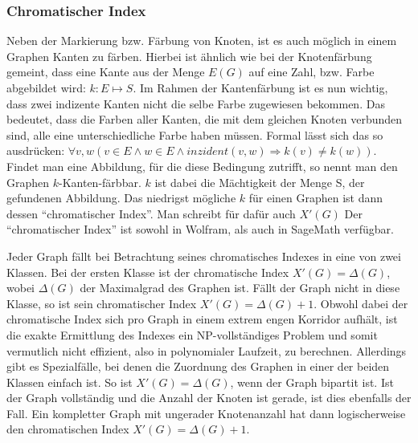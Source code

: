 \documentclass[a4paper,12pt,ngerman,chapterprefix=false,listof=totoc,bibliography=totoc]{scrreprt}
\begin{document}
\subsubsection*{Chromatischer Index}
{
Neben der Markierung bzw. Färbung von Knoten, ist es auch möglich in einem Graphen Kanten zu färben. Hierbei ist ähnlich wie bei der Knotenfärbung gemeint, dass eine Kante aus der Menge \(E(G)\) auf eine Zahl, bzw. Farbe abgebildet wird: \(k: E\mapsto S\). Im Rahmen der Kantenfärbung ist es nun wichtig, dass zwei indizente Kanten nicht die selbe Farbe zugewiesen bekommen. Das bedeutet, dass die Farben aller Kanten, die mit dem gleichen Knoten verbunden sind, alle eine unterschiedliche Farbe haben müssen. Formal lässt sich das so ausdrücken: \(\forall v,w(v\in E \land w\in E \land inzident(v,w)\Rightarrow k(v)\neq k(w))\). Findet man eine Abbildung, für die diese Bedingung zutrifft, so nennt man den Graphen \(k\)-Kanten-färbbar. \(k\) ist dabei die Mächtigkeit der Menge S, der gefundenen Abbildung. Das niedrigst mögliche \(k\) für einen Graphen ist dann dessen "`chromatischer Index"'. Man schreibt für dafür auch \(X'(G)\) Der "`chromatischer Index"' ist sowohl in Wolfram, als auch in SageMath verfügbar. \cite{andersen_edge-colorings_1977,sagemath_graph_2020-1,wolfram_wolfram_2020-1}

Jeder Graph fällt bei Betrachtung seines chromatisches Indexes in eine von zwei Klassen. Bei der ersten Klasse ist der chromatische Index \(X'(G)=\Delta(G)\), wobei \(\Delta(G)\) der Maximalgrad des Graphen ist. Fällt der Graph nicht in diese Klasse, so ist sein chromatischer Index \(X'(G)=\Delta(G)+1\). Obwohl dabei der chromatische Index sich pro Graph in einem extrem engen Korridor aufhält, ist die exakte Ermittlung des Indexes ein NP-vollständiges Problem und somit vermutlich nicht effizient, also in polynomialer Laufzeit, zu berechnen. Allerdings gibt es Spezialfälle, bei denen die Zuordnung des Graphen in einer der beiden Klassen einfach ist. So ist \(X'(G)=\Delta(G)\), wenn der Graph bipartit ist. Ist der Graph vollständig und die Anzahl der Knoten ist gerade, ist dies ebenfalls der Fall. Ein kompletter Graph mit ungerader Knotenanzahl hat dann logischerweise den chromatischen Index \(X'(G)=\Delta(G)+1\). \cite{plantholt_chromatic_1983}

}
\end{document}
